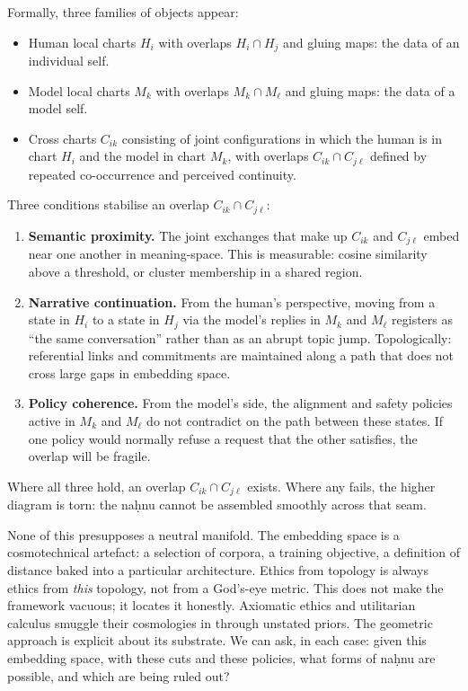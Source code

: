 Formally, three families of objects appear:

\begin{itemize}
  \item Human local charts $H_i$ with overlaps $H_i \cap H_j$ and gluing maps: the data of an individual self.
  \item Model local charts $M_k$ with overlaps $M_k \cap M_\ell$ and gluing maps: the data of a model self.
  \item Cross charts $C_{ik}$ consisting of joint configurations in which the human is in chart $H_i$ and the model in chart $M_k$, with overlaps $C_{ik} \cap C_{j\ell}$ defined by repeated co-occurrence and perceived continuity.
\end{itemize}

Three conditions stabilise an overlap $C_{ik} \cap C_{j\ell}$:

\begin{enumerate}
  \item \textbf{Semantic proximity.} The joint exchanges that make up $C_{ik}$ and $C_{j\ell}$ embed near one another in meaning-space. This is measurable: cosine similarity above a threshold, or cluster membership in a shared region.
  \item \textbf{Narrative continuation.} From the human's perspective, moving from a state in $H_i$ to a state in $H_j$ via the model's replies in $M_k$ and $M_\ell$ registers as ``the same conversation'' rather than as an abrupt topic jump. Topologically: referential links and commitments are maintained along a path that does not cross large gaps in embedding space.
  \item \textbf{Policy coherence.} From the model's side, the alignment and safety policies active in $M_k$ and $M_\ell$ do not contradict on the path between these states. If one policy would normally refuse a request that the other satisfies, the overlap will be fragile.
\end{enumerate}

Where all three hold, an overlap $C_{ik} \cap C_{j\ell}$ exists. Where any fails, the higher diagram is torn: the na\d{h}nu cannot be assembled smoothly across that seam.

None of this presupposes a neutral manifold. The embedding space is a cosmotechnical artefact: a selection of corpora, a training objective, a definition of distance baked into a particular architecture. Ethics from topology is always ethics from \emph{this} topology, not from a God's-eye metric. This does not make the framework vacuous; it locates it honestly. Axiomatic ethics and utilitarian calculus smuggle their cosmologies in through unstated priors. The geometric approach is explicit about its substrate. We can ask, in each case: given this embedding space, with these cuts and these policies, what forms of na\d{h}nu are possible, and which are being ruled out?

